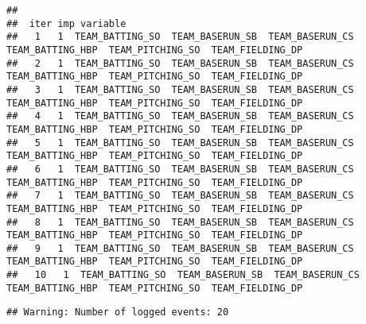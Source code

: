 \documentclass[
]{article}
\newenvironment{Shaded}{\begin{snugshade}}{\end{snugshade}}
\newcommand{\DataTypeTok}[1]{\textcolor[rgb]{0.13,0.29,0.53}{#1}}
\newcommand{\KeywordTok}[1]{\textcolor[rgb]{0.13,0.29,0.53}{\textbf{#1}}}
\newcommand{\NormalTok}[1]{#1}
\newcommand{\OperatorTok}[1]{\textcolor[rgb]{0.81,0.36,0.00}{\textbf{#1}}}
\newcommand{\StringTok}[1]{\textcolor[rgb]{0.31,0.60,0.02}{#1}}
\begin{document}
\begin{verbatim}
## 
##  iter imp variable
##   1   1  TEAM_BATTING_SO  TEAM_BASERUN_SB  TEAM_BASERUN_CS  TEAM_BATTING_HBP  TEAM_PITCHING_SO  TEAM_FIELDING_DP
##   2   1  TEAM_BATTING_SO  TEAM_BASERUN_SB  TEAM_BASERUN_CS  TEAM_BATTING_HBP  TEAM_PITCHING_SO  TEAM_FIELDING_DP
##   3   1  TEAM_BATTING_SO  TEAM_BASERUN_SB  TEAM_BASERUN_CS  TEAM_BATTING_HBP  TEAM_PITCHING_SO  TEAM_FIELDING_DP
##   4   1  TEAM_BATTING_SO  TEAM_BASERUN_SB  TEAM_BASERUN_CS  TEAM_BATTING_HBP  TEAM_PITCHING_SO  TEAM_FIELDING_DP
##   5   1  TEAM_BATTING_SO  TEAM_BASERUN_SB  TEAM_BASERUN_CS  TEAM_BATTING_HBP  TEAM_PITCHING_SO  TEAM_FIELDING_DP
##   6   1  TEAM_BATTING_SO  TEAM_BASERUN_SB  TEAM_BASERUN_CS  TEAM_BATTING_HBP  TEAM_PITCHING_SO  TEAM_FIELDING_DP
##   7   1  TEAM_BATTING_SO  TEAM_BASERUN_SB  TEAM_BASERUN_CS  TEAM_BATTING_HBP  TEAM_PITCHING_SO  TEAM_FIELDING_DP
##   8   1  TEAM_BATTING_SO  TEAM_BASERUN_SB  TEAM_BASERUN_CS  TEAM_BATTING_HBP  TEAM_PITCHING_SO  TEAM_FIELDING_DP
##   9   1  TEAM_BATTING_SO  TEAM_BASERUN_SB  TEAM_BASERUN_CS  TEAM_BATTING_HBP  TEAM_PITCHING_SO  TEAM_FIELDING_DP
##   10   1  TEAM_BATTING_SO  TEAM_BASERUN_SB  TEAM_BASERUN_CS  TEAM_BATTING_HBP  TEAM_PITCHING_SO  TEAM_FIELDING_DP
\end{verbatim}

\begin{verbatim}
## Warning: Number of logged events: 20
\end{verbatim}

\begin{Shaded}
\end{Shaded}
\end{document}
